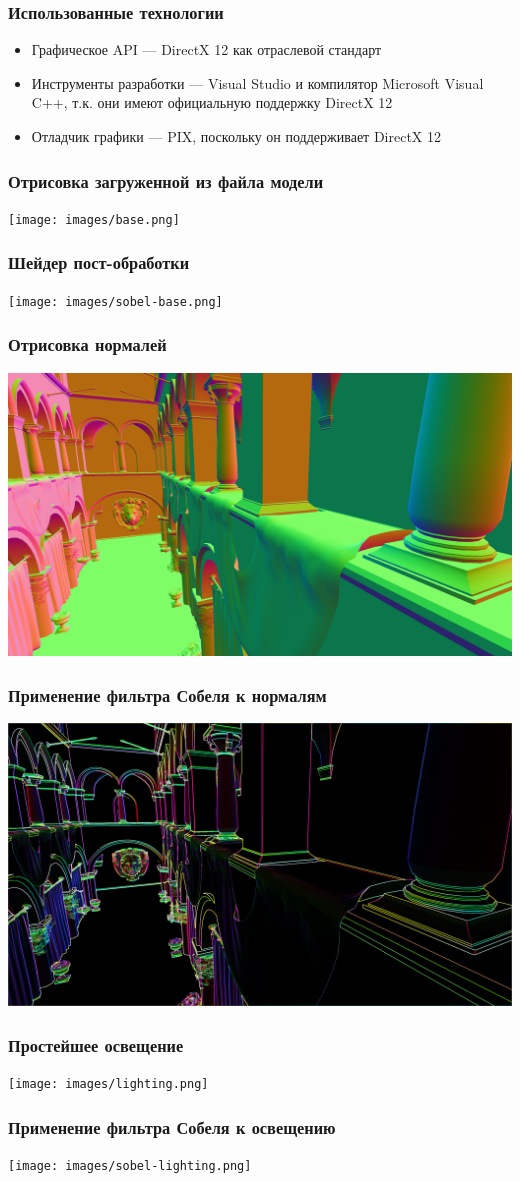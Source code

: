 \begin{frame}
    \frametitle{Использованные технологии}
    \begin{itemize}
        \item Графическое API --- DirectX 12 как отраслевой стандарт
        \item Инструменты разработки --- Visual Studio
        и компилятор Microsoft Visual C++,
        т.к. они имеют официальную поддержку DirectX 12
        \item Отладчик графики --- PIX,
        поскольку он поддерживает DirectX 12
    \end{itemize}
\end{frame}

\begin{frame}
    \frametitle{Отрисовка загруженной из файла модели}
    \texttt{[image: images/base.png]}
\end{frame}

\begin{frame}
    \frametitle{Шейдер пост-обработки}
    \texttt{[image: images/sobel-base.png]}
\end{frame}

\begin{frame}
    \frametitle{Отрисовка нормалей}
    \includegraphics[width=\textwidth]{images/norm.png}
\end{frame}

\begin{frame}
    \frametitle{Применение фильтра Собеля к нормалям}
    \includegraphics[width=\textwidth]{images/sobel-norm.png}
\end{frame}

\begin{frame}
    \frametitle{Простейшее освещение}
    \texttt{[image: images/lighting.png]}
\end{frame}

\begin{frame}
    \frametitle{Применение фильтра Собеля к освещению}
    \texttt{[image: images/sobel-lighting.png]}
\end{frame}

